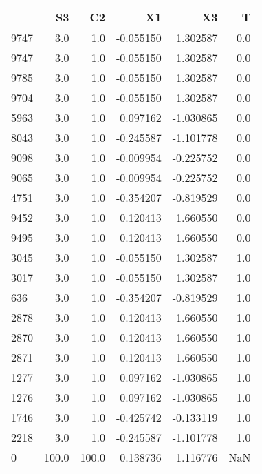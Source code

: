 \begin{tabular}{lrrrrr}
\toprule
{} &     S3 &     C2 &        X1 &        X3 &    T \\
\midrule
9747 &    3.0 &    1.0 & -0.055150 &  1.302587 &  0.0 \\
9747 &    3.0 &    1.0 & -0.055150 &  1.302587 &  0.0 \\
9785 &    3.0 &    1.0 & -0.055150 &  1.302587 &  0.0 \\
9704 &    3.0 &    1.0 & -0.055150 &  1.302587 &  0.0 \\
5963 &    3.0 &    1.0 &  0.097162 & -1.030865 &  0.0 \\
8043 &    3.0 &    1.0 & -0.245587 & -1.101778 &  0.0 \\
9098 &    3.0 &    1.0 & -0.009954 & -0.225752 &  0.0 \\
9065 &    3.0 &    1.0 & -0.009954 & -0.225752 &  0.0 \\
4751 &    3.0 &    1.0 & -0.354207 & -0.819529 &  0.0 \\
9452 &    3.0 &    1.0 &  0.120413 &  1.660550 &  0.0 \\
9495 &    3.0 &    1.0 &  0.120413 &  1.660550 &  0.0 \\
3045 &    3.0 &    1.0 & -0.055150 &  1.302587 &  1.0 \\
3017 &    3.0 &    1.0 & -0.055150 &  1.302587 &  1.0 \\
636  &    3.0 &    1.0 & -0.354207 & -0.819529 &  1.0 \\
2878 &    3.0 &    1.0 &  0.120413 &  1.660550 &  1.0 \\
2870 &    3.0 &    1.0 &  0.120413 &  1.660550 &  1.0 \\
2871 &    3.0 &    1.0 &  0.120413 &  1.660550 &  1.0 \\
1277 &    3.0 &    1.0 &  0.097162 & -1.030865 &  1.0 \\
1276 &    3.0 &    1.0 &  0.097162 & -1.030865 &  1.0 \\
1746 &    3.0 &    1.0 & -0.425742 & -0.133119 &  1.0 \\
2218 &    3.0 &    1.0 & -0.245587 & -1.101778 &  1.0 \\
0    &  100.0 &  100.0 &  0.138736 &  1.116776 &  NaN \\
\bottomrule
\end{tabular}
